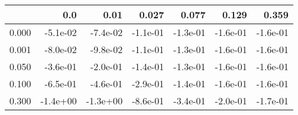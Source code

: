 \begin{tabular}{lrrrrrr}
\toprule
{} &      0.0 &     0.01 &    0.027 &    0.077 &    0.129 &    0.359 \\
\midrule
0.000 & -5.1e-02 & -7.4e-02 & -1.1e-01 & -1.3e-01 & -1.6e-01 & -1.6e-01 \\
0.001 & -8.0e-02 & -9.8e-02 & -1.1e-01 & -1.3e-01 & -1.6e-01 & -1.6e-01 \\
0.050 & -3.6e-01 & -2.0e-01 & -1.4e-01 & -1.3e-01 & -1.6e-01 & -1.6e-01 \\
0.100 & -6.5e-01 & -4.6e-01 & -2.9e-01 & -1.4e-01 & -1.6e-01 & -1.6e-01 \\
0.300 & -1.4e+00 & -1.3e+00 & -8.6e-01 & -3.4e-01 & -2.0e-01 & -1.7e-01 \\
\bottomrule
\end{tabular}
